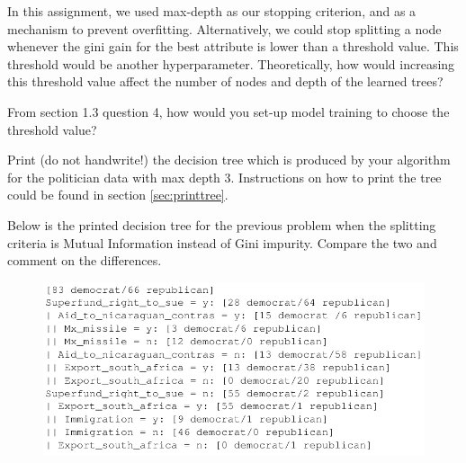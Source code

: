 \begin{questions}
    \begin{tcolorbox}[fit,height=8cm, width=15cm, blank, borderline={1pt}{-2pt},nobeforeafter]
    \end{tcolorbox}
    


    \question[2] In this assignment, we used max-depth as our stopping criterion, and as a mechanism to prevent overfitting. Alternatively, we could stop splitting a node whenever the gini gain for the best attribute is lower than a threshold value. This threshold would be another hyperparameter. Theoretically, how would increasing this threshold value affect the number of nodes and depth of the learned trees?
    
    \begin{tcolorbox}[fit,height=8cm, width=15cm, blank, borderline={1pt}{-2pt},nobeforeafter]
    \end{tcolorbox}
    


\clearpage
    \question[2] From section 1.3 question 4, how would you set-up model training to choose the threshold value?
    
    \begin{tcolorbox}[fit,height=10cm, width=15cm, blank, borderline={1pt}{-2pt},nobeforeafter]
    \end{tcolorbox}
    

    
\clearpage
    \question[3] Print (do not handwrite!) the decision tree which is produced by your algorithm for the politician data with max depth 3. Instructions on how to print the tree could be found in section \ref{sec:printtree}.
    
    \begin{tcolorbox}[fit,height=19cm, width=15cm, blank, borderline={1pt}{-2pt},nobeforeafter]
    

    
    \end{tcolorbox}
    
    
    
    \clearpage
    \question[2] Below is the printed decision tree for the previous problem when the splitting criteria is Mutual Information instead of Gini impurity. Compare the two and comment on the differences.
    \begin{figure}[H]
    \begin{center}
    \includegraphics[scale=1]{images/mutual.png}
    \end{center}
    \end{figure}
    

\end{questions}
